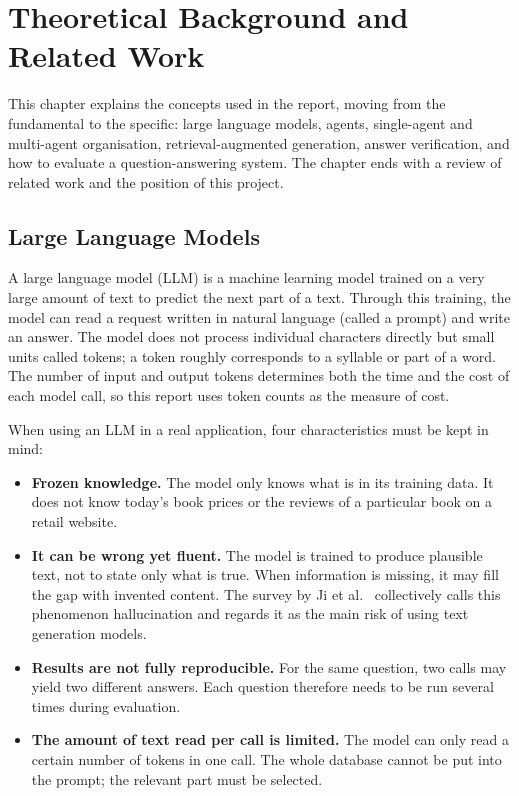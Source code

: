 \chapter{Theoretical Background and Related Work}
\label{ch:co-so}

This chapter explains the concepts used in the report, moving from the fundamental to the specific: large language models, agents, single-agent and multi-agent organisation, retrieval-augmented generation, answer verification, and how to evaluate a question-answering system. The chapter ends with a review of related work and the position of this project.

\section{Large Language Models}

A large language model (LLM) is a machine learning model trained on a very large amount of text to predict the next part of a text. Through this training, the model can read a request written in natural language (called a prompt) and write an answer. The model does not process individual characters directly but small units called tokens; a token roughly corresponds to a syllable or part of a word. The number of input and output tokens determines both the time and the cost of each model call, so this report uses token counts as the measure of cost.

When using an LLM in a real application, four characteristics must be kept in mind:

\begin{itemize}
    \item \textbf{Frozen knowledge.} The model only knows what is in its training data. It does not know today's book prices or the reviews of a particular book on a retail website.
    \item \textbf{It can be wrong yet fluent.} The model is trained to produce plausible text, not to state only what is true. When information is missing, it may fill the gap with invented content. The survey by Ji et al.\  collectively calls this phenomenon hallucination and regards it as the main risk of using text generation models.
    \item \textbf{Results are not fully reproducible.} For the same question, two calls may yield two different answers. Each question therefore needs to be run several times during evaluation.
    \item \textbf{The amount of text read per call is limited.} The model can only read a certain number of tokens in one call. The whole database cannot be put into the prompt; the relevant part must be selected.
\end{itemize}

